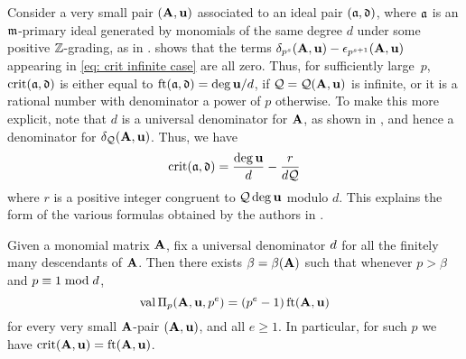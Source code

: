 \documentclass{amsart}
\begin{document}
\begin{remark}
   Consider a very small pair $(\mathbf{A},\mathbf{u})$ associated to an ideal pair $(\mathfrak{a},\mathfrak{d})$, where $\mathfrak{a}$ is an $\mathfrak{m}$-primary ideal generated by monomials of the same degree $d$ under some positive $\mathbb{Z}$-grading, as in .
    shows that the terms $\delta_{p^s}(\mathbf{A},\mathbf{u})-\epsilon_{p^{s+1}}(\mathbf{A},\mathbf{u})$ appearing in \eqref{eq: crit infinite case} are all zero.
   Thus, for sufficiently large~$p$, $\operatorname{crit}(\mathfrak{a},\mathfrak{d})$ is either equal to $\operatorname{ft}(\mathfrak{a}, \mathfrak{d}) = \deg \mathbf{u}/d$, if $\mathcal{Q}=\mathcal{Q}(\mathbf{A},\mathbf{u})$ is infinite, or it is a rational number with denominator a power of $p$ otherwise.
   To make this more explicit, note that $d$ is a universal denominator for $\mathbf{A}$, as shown in , and hence a denominator for $\delta_{\mathcal{Q}}(\mathbf{A},\mathbf{u})$.
   Thus, we have
   \[\operatorname{crit}(\mathfrak{a},\mathfrak{d}) = \frac{\deg \mathbf{u}}{d} - \frac{r}{d\mathcal{Q}} \]
   where $r$ is a positive integer congruent to $\mathcal{Q}\deg\mathbf{u}$ modulo $d$.
   This explains the form of the various formulas obtained by the authors in \cite[Theorems~3.6, 4.8, and~5.5]{hernandez+etal.frobenius_examples}.
\end{remark}


\begin{proposition}
	\label{simple-special: P}
   Given a monomial matrix $\mathbf{A}$, fix a universal denominator $d$ for all the finitely many descendants of $\mathbf{A}$.
   Then there exists $\beta = \beta(\mathbf{A})$ such that whenever $p>\beta$ and $p \equiv 1 \bmod d$,
\[
 \operatorname{val}\Pi_p(\mathbf{A},\mathbf{u},p^e) = (p^e-1) \operatorname{ft}(\mathbf{A}, \mathbf{u})
\]
for every very small $\mathbf{A}$-pair $(\mathbf{A}, \mathbf{u})$, and all $e \geq 1$.
In particular, for such $p$ we have $\operatorname{crit}(\mathbf{A},\mathbf{u}) = \operatorname{ft}(\mathbf{A}, \mathbf{u})$.
\end{proposition}
\end{document}
